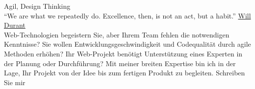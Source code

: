 \documentclass[9pt]{developercv} %
\begin{document}
\vspace{0.5cm}



\begin{minipage}[t]{0.4\textwidth} %
	\vspace{-\baselineskip} %
  
  Agil, Design Thinking\\
  ``We are what we repeatedly do. Excellence, then, is not an act, but a habit.''
  \href{https://medium.com/the-mission/my-favourite-quote-of-all-time-is-a-misattribution-66356f22843d}{Will Durant}\\
  Web-Technologien begeistern Sie, aber Ihrem Team fehlen die notwendigen Kenntnisse?
 Sie wollen Entwicklungsgeschwindigkeit und Codequalität durch agile Methoden erhöhen?
 Ihr Web-Projekt benötigt Unterstützung eines Experten in der Planung oder Durchführung?
Mit meiner breiten Expertise bin ich in der Lage, Ihr Projekt von der Idee bis zum fertigen Produkt zu
begleiten. Schreiben Sie mir

\end{minipage}
\hfill %
\begin{minipage}[t]{0.5\textwidth} %
	\vspace{-\baselineskip} %
	\begin{barchart}{5.5}
	\end{barchart}
\end{minipage}

\begin{center}
\end{center}


\end{document}
